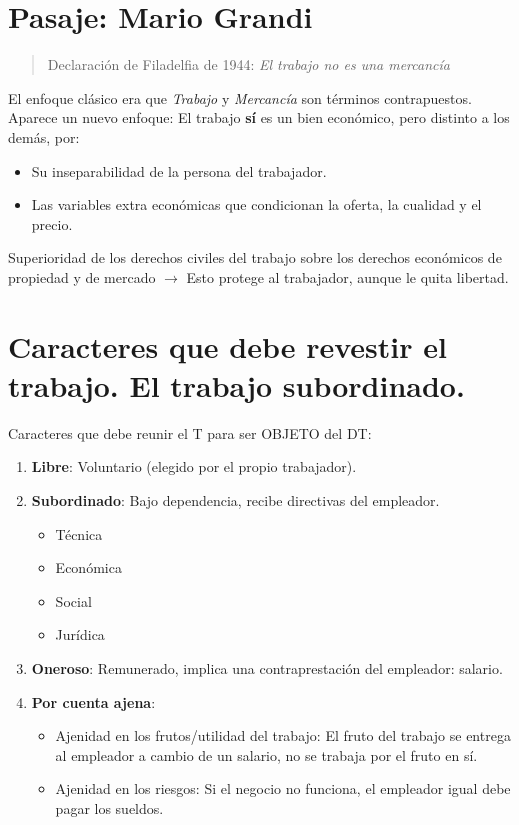 \documentclass[spanish,12pt,a4paper,titlepage]{report}
\begin{document}
\section{Pasaje: Mario Grandi}
\label{sec:pasaje-mario-grandi}

\begin{quote} Declaración de Filadelfia de 1944: \textit{El trabajo no es una mercancía}
\end{quote}

El enfoque clásico era que \textit{Trabajo} y \textit{Mercancía} son términos contrapuestos. Aparece un nuevo enfoque: El trabajo \textbf{sí} es un bien económico, pero distinto a los demás, por:
\begin{itemize}
\item Su inseparabilidad de la persona del trabajador.
\item Las variables extra económicas que condicionan la oferta, la cualidad y el precio.
\end{itemize}

Superioridad de los derechos civiles del trabajo sobre los derechos económicos de propiedad y de mercado $\rightarrow$ Esto protege al trabajador, aunque le quita libertad.

\section{Caracteres que debe revestir el trabajo. El trabajo subordinado.}
\label{sec:Caracteres-que-debe-revestir-el-trabajo.-El-trabajo-subordinado.}

Caracteres que debe reunir el T para ser OBJETO del DT:

\begin{enumerate}
\item \textbf{Libre}: Voluntario (elegido por el propio trabajador).
\item \textbf{Subordinado}: Bajo dependencia, recibe directivas del empleador.
  \begin{itemize}
  \item Técnica
  \item Económica
  \item Social
  \item Jurídica
  \end{itemize}
\item \textbf{Oneroso}: Remunerado, implica una contraprestación del empleador: salario.
\item \textbf{Por cuenta ajena}:
\label{sec:por-cuenta-ajena}
  \begin{itemize}
  \item Ajenidad en los frutos/utilidad del trabajo: El fruto del trabajo se entrega al empleador a cambio de un salario, no se trabaja por el fruto en sí.
  \item Ajenidad en los riesgos: Si el negocio no funciona, el empleador igual debe pagar los sueldos.
  \end{itemize}
\end{enumerate}
\end{document}
